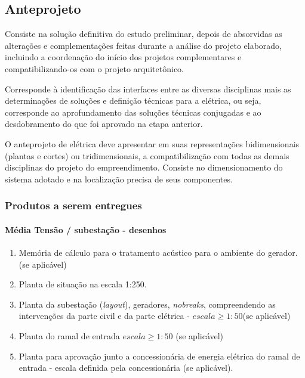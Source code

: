 \subsection{Anteprojeto} \label{subsection: anteprojeto}

Consiste na solução definitiva do estudo preliminar, depois de absorvidas as alterações e complementações feitas durante a análise do projeto elaborado, incluindo a coordenação do início dos projetos complementares e compatibilizando-os com o projeto arquitetônico.

Corresponde à identificação das interfaces entre as diversas disciplinas mais as determinações de soluções e definição técnicas para a elétrica, ou seja, corresponde ao aprofundamento das soluções técnicas conjugadas e ao desdobramento do que foi aprovado na etapa anterior.

O anteprojeto de elétrica deve apresentar em suas representações bidimensionais (plantas e cortes) ou tridimensionais, a compatibilização com todas as demais disciplinas do projeto do empreendimento.
Consiste no dimensionamento do sistema adotado e na localização precisa de seus componentes.

\subsubsection{Produtos a serem entregues}

\paragraph{Média Tensão / subestação - desenhos}

\begin{enumerate}
	\item Memória de cálculo para o tratamento acústico para o ambiente do gerador. (se aplicável)
	
	\item Planta de situação na escala 1:250.
	
	\item Planta da subestação (\textit{layout}), geradores, \textit{nobreaks}, compreendendo as intervenções da  parte civil e da parte elétrica - $escala \geq 1:50$(se aplicável)
	
	\item Planta do ramal de entrada $escala \geq 1:50$ (se aplicável)
	
	\item Planta para aprovação junto a concessionária de energia elétrica do ramal de entrada - escala definida pela concessionária (se aplicável). 
\end{enumerate}

